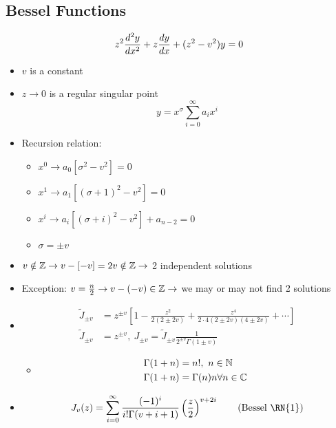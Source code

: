 \documentclass[Maths.tex]{subfiles}
\begin{document}
\chapter{}
\section{Bessel Functions}
\begin{align*}
	z^2\frac{d^2 y}{dx^2} + z\frac{dy}{dx} + (z^2 - v^2)y = 0
\end{align*}
\begin{itemize}
	\item $v$ is a constant
	\item $z \to 0$ is a regular singular point
	\begin{equation*}
		y = x^\sigma \sum_{i=0}^\infty a_ix^i
	\end{equation*}
	\item Recursion relation:
	\begin{itemize}
		\item $x^0 \to a_0[\sigma^2 - v^2] = 0$
		\item $x^1 \to a_1[(\sigma+1)^2 - v^2] = 0$
		\item $x^i \to a_i[(\sigma+i)^2 - v^2] + a_{n-2} = 0$
		\item $\sigma = \pm v$
	\end{itemize}
	\item $v \notin \mathbb{Z} \to v-[-v] = 2v \notin \mathbb{Z} \to$ 2 independent solutions
	\item Exception: $v = \frac{n}{2} \to v - (-v) \in \mathbb{Z} \to$ we may or may not find 2 solutions
	\item
	\begin{align*}
		\tilde{J}_{\pm v} &= z^{\pm v}\left[1 - \frac{z^2}{2(2\pm2v)} + \frac{z^4}{2\cdot4(2\pm2v)(4\pm2v)} + \cdots\right] \\
		\tilde{J}_{\pm v} &= z^{\pm v},~ J_{\pm v} = \tilde{J}_{\pm v}\frac{1}{2^{\pm v}\Gamma(1\pm v)}
	\end{align*}
	\begin{itemize}
		\item
		\begin{align*}
			\Gamma(1+n) &= n!,~ n \in \mathbb{N} \\
			\Gamma(1+n) &= \Gamma(n)n \forall n \in \mathbb{C}
		\end{align*}
	\end{itemize}
	\item
	\begin{equation}
		J_v(z) = \sum_{i=0}^\infty \frac{(-1)^i}{i!\Gamma(v+i+1)}\left(\frac{z}{2}\right)^{v+2i} \tag{Bessel \RN{1}}

\end{equation}
\end{itemize}
\end{document}
